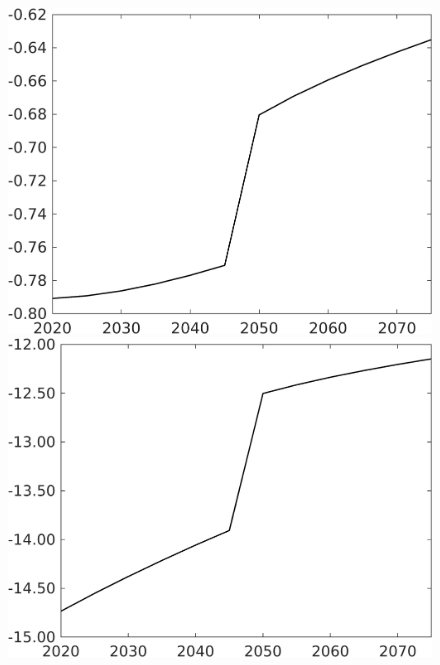 \documentclass[12pt]{article}
\begin{document}
\begin{figure}[h!!]
\begin{minipage}[]{0.32\textwidth}
\end{minipage}	
\begin{minipage}[]{0.32\textwidth}
\includegraphics[width=1\textwidth]{../../codding_model/own_basedOnFried/optimalPol_010922_revision/figures/all_13Sept22/CompTaufPER_bytaul_Reg0_Lf_spillover0_nsk0_xgr0_knspil0_sep0_LFlimit1_emsbase0_countec0_GovRev0_etaa0.79_lgd0.png}
\end{minipage}		
\begin{minipage}[]{0.32\textwidth}
\includegraphics[width=1\textwidth]{../../codding_model/own_basedOnFried/optimalPol_010922_revision/figures/all_13Sept22/CompTaufPER_bytaul_Reg0_Lg_spillover0_nsk0_xgr0_knspil0_sep0_LFlimit1_emsbase0_countec0_GovRev0_etaa0.79_lgd0.png}

\end{minipage}
\end{figure}
\end{document}
